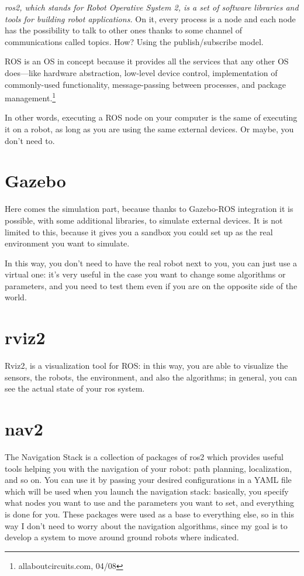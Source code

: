 {\it \Acrshort{ros}2, which stands for Robot Operative System 2, is a set of software libraries and tools for building robot applications.}\cite{ros2desc} On it, every process is a node and each node has the possibility to talk to other ones thanks to some channel of communications called topics. How? Using the publish/subscribe model.

ROS is an OS in concept because it provides all the services that any other OS does—like hardware abstraction, low-level device control, implementation of commonly-used functionality, message-passing between processes, and package management.\footnote{allaboutcircuits.com, 04/08}

In other words, executing a ROS node on your computer is the same of executing it on a robot, as long as you are using the same external devices. Or maybe, you don't need to.

\section{Gazebo}

Here comes the simulation part, because thanks to Gazebo-ROS integration it is possible, with some additional libraries, to simulate external devices. It is not limited to this, because it gives you a sandbox you could set up as the real environment you want to simulate.

In this way, you don't need to have the real robot next to you, you can just use a virtual one: it's very useful in the case you want to change some algorithms or parameters, and you need to test them even if you are on the opposite side of the world.


\section{rviz2}

Rviz2, is a visualization tool for ROS: in this way, you are able to visualize the sensors, the robots, the environment, and also the algorithms; in general, you can see the actual state of your \Acrshort{ros} system.

\section{\Acrfull{nav2}}

The Navigation Stack is a collection of packages of \Acrshort{ros}2 which provides useful tools helping you with the navigation of your robot: path planning, localization, and so on. You can use it by passing your desired configurations in a YAML file which will be used when you launch the navigation stack: basically, you specify what nodes you want to use and the parameters you want to set, and everything is done for you.
These packages were used as a base to everything else, so in this way I don't need to worry about the navigation algorithms, since my goal is to develop a system to move around ground robots where indicated.

